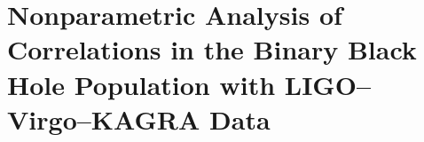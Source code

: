 %
%
%
%
%
%
%
%
\chapter{Nonparametric Analysis of Correlations in the Binary Black Hole Population with LIGO--Virgo--KAGRA Data}

